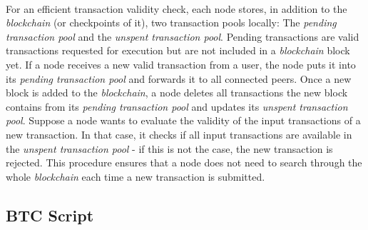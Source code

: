 \documentclass{cacthesis}
\begin{document}
        \\ For an efficient transaction validity check, each node stores, in addition to the \textit{blockchain} (or checkpoints of it), two transaction pools locally: The \textit{pending transaction pool} and the \textit{unspent transaction pool}. Pending transactions are valid transactions requested for execution but are not included in a \textit{blockchain} block yet. If a node receives a new valid transaction from a user, the node puts it into its \textit{pending transaction pool} and forwards it to all connected peers. Once a new block is added to the \textit{blockchain}, a node deletes all transactions the new block contains from its \textit{pending transaction pool} and updates its \textit{unspent transaction pool}. Suppose a node wants to evaluate the validity of the input transactions of a new transaction. In that case, it checks if all input transactions are available in the \textit{unspent transaction pool} - if this is not the case, the new transaction is rejected. This procedure ensures that a node does not need to search through the whole \textit{blockchain} each time a new transaction is submitted. \\

        \subsection{BTC Script}
        \label{sub:BTCScript}
        
\end{document}
